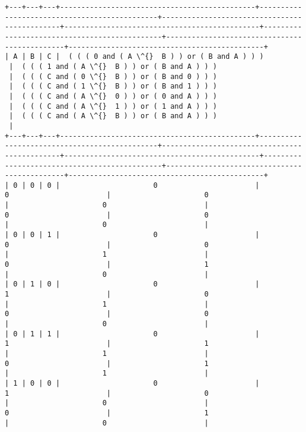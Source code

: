 \documentclass[11pt]{article}
\begin{document}
    \begin{Verbatim}[commandchars=\\\{\}]
+---+---+---+----------------------------------------------+----------------------------------------------+----------------------------------------------+----------------------------------------------+----------------------------------------------+----------------------------------------------+----------------------------------------------+
| A | B | C |  ( ( ( 0 and ( A \^{}  B ) ) or ( B and A ) ) )
 |  ( ( ( 1 and ( A \^{}  B ) ) or ( B and A ) ) )
 |  ( ( ( C and ( 0 \^{}  B ) ) or ( B and 0 ) ) )
 |  ( ( ( C and ( 1 \^{}  B ) ) or ( B and 1 ) ) )
 |  ( ( ( C and ( A \^{}  0 ) ) or ( 0 and A ) ) )
 |  ( ( ( C and ( A \^{}  1 ) ) or ( 1 and A ) ) )
 |  ( ( ( C and ( A \^{}  B ) ) or ( B and A ) ) )
 |
+---+---+---+----------------------------------------------+----------------------------------------------+----------------------------------------------+----------------------------------------------+----------------------------------------------+----------------------------------------------+----------------------------------------------+
| 0 | 0 | 0 |                      0                       |                      0                       |                      0                       |                      0                       |                      0                       |                      0                       |                      0                       |
| 0 | 0 | 1 |                      0                       |                      0                       |                      0                       |                      1                       |                      0                       |                      1                       |                      0                       |
| 0 | 1 | 0 |                      0                       |                      1                       |                      0                       |                      1                       |                      0                       |                      0                       |                      0                       |
| 0 | 1 | 1 |                      0                       |                      1                       |                      1                       |                      1                       |                      0                       |                      1                       |                      1                       |
| 1 | 0 | 0 |                      0                       |                      1                       |                      0                       |                      0                       |                      0                       |                      1                       |                      0                       |

\end{Verbatim}
\end{document}
